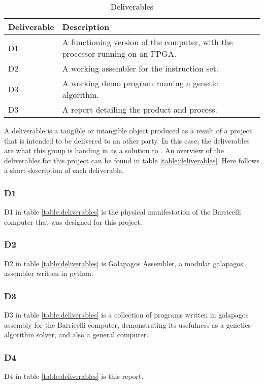  \begin{table}[H]
 \begin{center}
 \begin{tabular}{| l | p{8cm} |}
 \hline
 Deliverable & Description \\
 \hline
 D1 & A functioning version of the computer, with the processor running on an FPGA.\\
 D2 & A working assembler for the instruction set.\\
 D3 & A working demo program running a genetic algorithm.\\
 D3 & A report detailing the product and process.\\
 \hline
 \end{tabular}
 \caption{Deliverables}
 \label{table:deliverables}
 \end{center}
 \end{table}

A deliverable is a tangible or intangible object produced as a result of a project that is intended to be delivered to an other party.
In this case, the deliverables are what this group is handing in as a solution to .
An overview of the deliverables for this project can be found in table \vref{table:deliverables}.
Here follows a short description of each deliverable.

\subsubsection{D1}

D1 in table \vref{table:deliverables} is the physical manifestation of the Barricelli computer that was designed for this project.

\subsubsection{D2}

D2 in table \vref{table:deliverables} is Galapagos Assembler, a modular \gls{galapagos} assembler written in python.

\subsubsection{D3}

D3 in table \vref{table:deliverables} is a collection of programs written in galapagos assembly for the Barricelli computer, demonstrating its usefulness as a genetics algorithm solver, and also a general computer.

\subsubsection{D4}

D4 in table \vref{table:deliverables} is this report.

